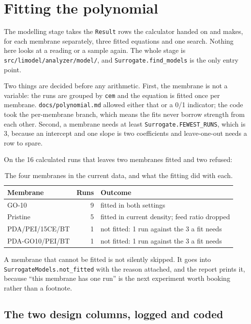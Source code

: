 \section{Fitting the polynomial}

The modelling stage takes the \texttt{Result} rows the calculator handed on and makes, for each
membrane separately, three fitted equations and one search. Nothing here looks at a reading or
a sample again. The whole stage is \texttt{src/limodel/analyzer/model/}, and
\texttt{Surrogate.find\_models} is the only entry point.

Two things are decided before any arithmetic. First, the membrane is not a variable: the runs
are grouped by \texttt{cem} and the equation is fitted once per membrane.
\texttt{docs/polynomial.md} allowed either that or a 0/1 indicator; the code took the
per-membrane branch, which means the fits never borrow strength from each other. Second, a
membrane needs at least \texttt{Surrogate.FEWEST\_RUNS}, which is 3, because an intercept and
one slope is two coefficients and leave-one-out needs a row to spare.

On the 16 calculated runs that leaves two membranes fitted and two refused:

\begin{table}[htbp]
  \centering
  \caption{The four membranes in the current data, and what the fitting did with each.}
  \label{tab:membranes-fitted}
  \begin{tabular}{@{}lrl@{}}
    \toprule
    Membrane & Runs & Outcome \\
    \midrule
    GO-10            & 9 & fitted in both settings \\
    Pristine         & 5 & fitted in current density; feed ratio dropped \\
    PDA/PEI/15CE/BT  & 1 & not fitted: 1 run against the 3 a fit needs \\
    PDA-GO10/PEI/BT  & 1 & not fitted: 1 run against the 3 a fit needs \\
    \bottomrule
  \end{tabular}
\end{table}

A membrane that cannot be fitted is not silently skipped. It goes into
\texttt{SurrogateModels\allowbreak{}.not\_fitted} with the reason attached, and the report prints
it, because
``this membrane has one run'' is the next experiment worth booking rather than a footnote.

\subsection{The two design columns, logged and coded}

